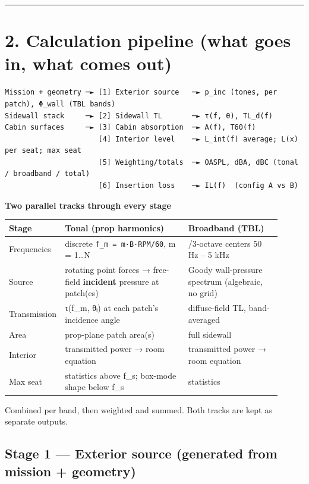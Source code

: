 \documentclass[10pt,a4paper]{article}
\begin{document}
\noindent\rule{\linewidth}{0.4pt}

\section*{2. Calculation pipeline (what goes in, what comes out)}

\begin{Verbatim}[breaklines,fontsize=\small,frame=single,rulecolor=\color{gray}]
Mission + geometry ─► [1] Exterior source   ─► p_inc (tones, per patch), Φ_wall (TBL bands)
Sidewall stack     ─► [2] Sidewall TL       ─► τ(f, θ), TL_d(f)
Cabin surfaces     ─► [3] Cabin absorption  ─► A(f), T60(f)
                      [4] Interior level    ─► L_int(f) average; L(x) per seat; max seat
                      [5] Weighting/totals  ─► OASPL, dBA, dBC (tonal / broadband / total)
                      [6] Insertion loss    ─► IL(f)  (config A vs B)
\end{Verbatim}

\textbf{Two parallel tracks through every stage}

{\small
\begin{longtable}{>{\raggedright\arraybackslash}p{0.105\linewidth}>{\raggedright\arraybackslash}p{0.458\linewidth}>{\raggedright\arraybackslash}p{0.347\linewidth}}
\hline
\textbf{Stage} & \textbf{Tonal (prop harmonics)} & \textbf{Broadband (TBL)} \\
\hline
\endhead
Frequencies & discrete \texttt{f\_\allowbreak{}m = m·B·RPM/\allowbreak{}60}, m = 1…N & 1/3-octave centers 50 Hz – 5 kHz \\
Source & rotating point forces → free-field \textbf{incident} pressure at patch(es) & Goody wall-pressure spectrum (algebraic, no grid) \\
Transmission & τ(f\_m, θᵢ) at each patch's incidence angle & diffuse-field TL, band-averaged \\
Area & prop-plane patch area(s) & full sidewall \\
Interior & transmitted power → room equation & transmitted power → room equation \\
Max seat & statistics above f\_s; box-mode shape below f\_s & statistics \\
\hline
\end{longtable}}

Combined per band, then weighted and summed. Both tracks are kept as separate outputs.

\subsection*{Stage 1 — Exterior source (generated from mission + geometry)}
\end{document}
